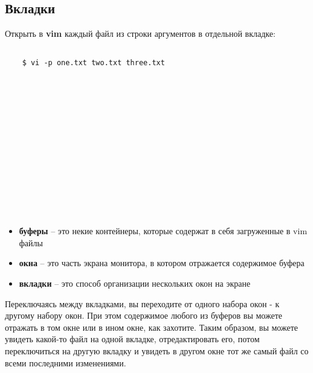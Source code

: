 \subsection*{Вкладки}

Открыть в \textbf{vim} каждый файл из строки аргументов в отдельной вкладке:
\begin{lstlisting}
	
	$ vi -p one.txt two.txt three.txt
	
\end{lstlisting}	

\noindent
{}\\
\\
\\
\\
\\
\\
\\
\\
\\
\\
\\

\begin{itemize}
	\item \textbf{буферы} -- это некие контейнеры, которые содержат в себя загруженные в vim файлы
	\item \textbf{окна} -- это часть экрана монитора, в котором отражается содержимое буфера
	\item \textbf{вкладки} -- это способ организации нескольких окон на экране
\end{itemize}

Переключаясь между вкладками, вы переходите от одного набора окон - к другому набору окон. При этом содержимое любого из буферов вы можете отражать в том окне или в ином окне, как захотите. Таким образом, вы можете увидеть какой-то файл на одной вкладке, отредактировать его, потом переключиться на другую вкладку и увидеть в другом окне тот же самый файл со всеми последними изменениями.



